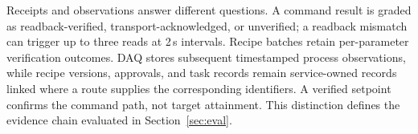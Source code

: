 Receipts and observations answer different questions. A command result is
graded as readback-verified, transport-acknowledged, or unverified; a
readback mismatch can trigger up to three reads at 2\,s intervals. Recipe
batches retain per-parameter verification outcomes. DAQ stores subsequent
timestamped process observations, while recipe versions, approvals, and
task records remain service-owned records linked where a route supplies the
corresponding identifiers. A verified setpoint confirms the command path,
not target attainment. This distinction defines the evidence chain evaluated
in Section~\ref{sec:eval}.
